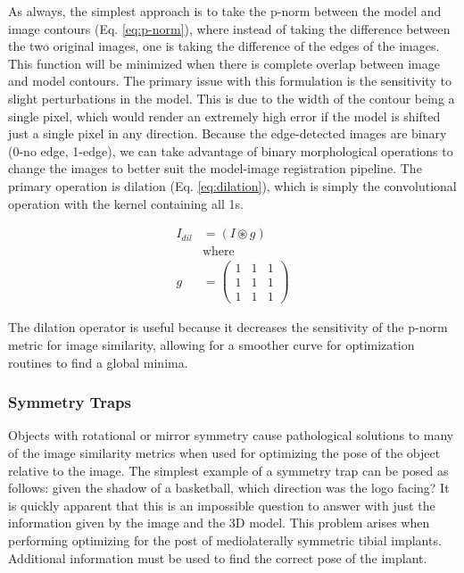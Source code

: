 As always, the simplest approach is to take the p-norm between the model and image contours (Eq. \ref{eq:p-norm}), where instead of taking the difference between the two original images, one is taking the difference of the edges of the images. This function will be minimized when there is complete overlap between image and model contours. The primary issue with this formulation is the sensitivity to slight perturbations in the model. This is due to the width of the contour being a single pixel, which would render an extremely high error if the model is shifted just a single pixel in any direction. Because the edge-detected images are binary (0-no edge, 1-edge), we can take advantage of binary morphological operations to change the images to better suit the model-image registration pipeline. The primary operation is dilation (Eq. \ref{eq:dilation}), which is simply the convolutional operation with the kernel containing all 1s.

\begin{equation}
\begin{aligned}
    I_{dil} &= (I \circledast g)\\
    &\text{where} \\
    g &= \begin{pmatrix}
        1 & 1 & 1 \\ 1 & 1 & 1 \\ 1& 1 & 1
    \end{pmatrix}
\end{aligned}
\label{eq:dilation}
\end{equation}

The dilation operator is useful because it decreases the sensitivity of the p-norm metric for image similarity, allowing for a smoother curve for optimization routines to find a global minima.

\subsubsection{Symmetry Traps}
Objects with rotational or mirror symmetry cause pathological solutions to many of the image similarity metrics when used for optimizing the pose of the object relative to the image. The simplest example of a symmetry trap can be posed as follows: given the shadow of a basketball, which direction was the logo facing? It is quickly apparent that this is an impossible question to answer with just the information given by the image and the 3D model. This problem arises when performing optimizing for the post of mediolaterally symmetric tibial implants. Additional information must be used to find the correct pose of the implant.

